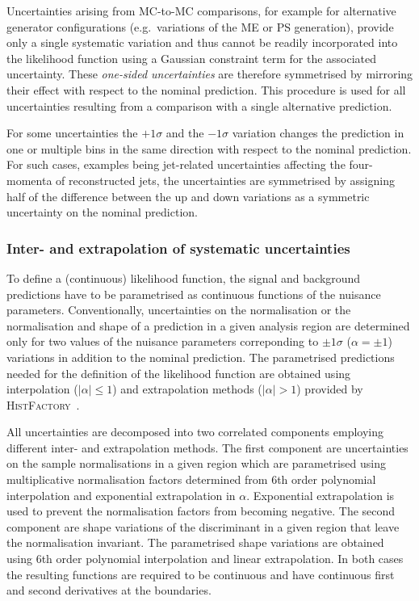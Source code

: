 Uncertainties arising from MC-to-MC comparisons, for example for
alternative generator configurations (e.g.\ variations of the ME or PS
generation), provide only a single systematic variation and thus
cannot be readily incorporated into the likelihood function using a
Gaussian constraint term for the associated uncertainty. These
\emph{one-sided uncertainties} are therefore symmetrised by mirroring
their effect with respect to the nominal prediction. This procedure is
used for all uncertainties resulting from a comparison with a single
alternative prediction.

For some uncertainties the $+1\sigma$ and the $-1\sigma$ variation
changes the prediction in one or multiple bins in the same direction
with respect to the nominal prediction. For such cases, examples being
jet-related uncertainties affecting the four-momenta of reconstructed
jets, the uncertainties are symmetrised by assigning half of the
difference between the up and down variations as a symmetric
uncertainty on the nominal prediction.


\subsubsection{Inter- and extrapolation of systematic uncertainties}

To define a (continuous) likelihood function, the signal and
background predictions have to be parametrised as continuous functions
of the nuisance parameters. Conventionally, uncertainties on the
normalisation or the normalisation and shape of a prediction in a
given analysis region are determined only for two values of the
nuisance parameters correponding to $\pm 1\sigma$ ($\alpha = \pm 1$)
variations in addition to the nominal prediction. The parametrised
predictions needed for the definition of the likelihood function are
obtained using interpolation ($\vert \alpha \vert \leq 1$) and
extrapolation methods ($\vert \alpha \vert > 1$) provided by
\textsc{HistFactory}~\cite{cranmer2012}.

All uncertainties are decomposed into two correlated components
employing different inter- and extrapolation methods. The first
component are uncertainties on the sample normalisations in a given
region which are parametrised using multiplicative normalisation
factors determined from 6th order polynomial interpolation and
exponential extrapolation in $\alpha$. Exponential extrapolation is
used to prevent the normalisation factors from becoming negative. The
second component are shape variations of the discriminant in a given
region that leave the normalisation invariant. The parametrised shape
variations are obtained using 6th order polynomial interpolation and
linear extrapolation. In both cases the resulting functions are
required to be continuous and have continuous first and second
derivatives at the boundaries.


